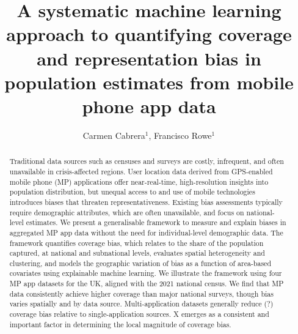 \documentclass[]{rsos}%
\begin{document}
\title{A systematic machine learning approach to quantifying coverage and representation bias in population estimates from mobile phone app data}

\author{
Carmen Cabrera$^{1}$,
Francisco Rowe$^{1}$}

\address{
  $^{1}$Geographic Data Science Lab, Department of Geography and Planning, University of Liverpool, Liverpool, United Kingdom.\\
  $^{}$}
\subject{
Mobile phone data,
Human mobility,
Explainable AI,
Spatial analysis}



\begin{abstract}
Traditional data sources such as censuses and surveys are costly, infrequent, and often unavailable in crisis-affected regions. User location data derived from GPS-enabled mobile phone (MP) applications offer near-real-time, high-resolution insights into population distribution, but unequal access to and use of mobile technologies introduces biases that threaten representativeness. Existing bias assessments typically require demographic attributes, which are often unavailable, and focus on national-level estimates. We present a generalisable framework to measure and explain biases in aggregated MP app data without the need for individual-level demographic data. The framework quantifies coverage bias, which relates to the share of the population captured, at national and subnational levels, evaluates spatial heterogeneity and clustering, and models the geographic variation of bias as a function of area-based covariates using explainable machine learning. We illustrate the framework using four MP app datasets for the UK, aligned with the 2021 national census. We find that MP data consistently achieve higher coverage than major national surveys, though bias varies spatially and by data source. Multi-application datasets generally reduce (?) coverage bias relative to single-application sources. X emerges as a consistent and important factor in determining the local magnitude of coverage bias.
\end{abstract}
\end{document}
